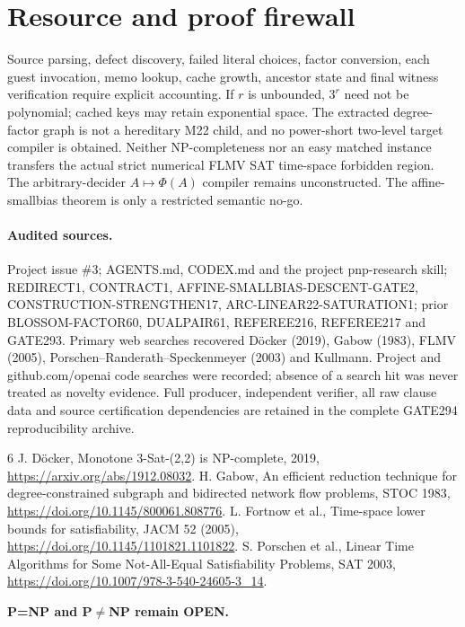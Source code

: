 \documentclass[11pt]{article}
\begin{document}
\section{Resource and proof firewall}
Source parsing, defect discovery, failed literal choices, factor conversion, each guest invocation, memo lookup, cache growth, ancestor state and final witness verification require explicit accounting. If $r$ is unbounded, $3^r$ need not be polynomial; cached keys may retain exponential space. The extracted degree-factor graph is not a hereditary M22 child, and no power-short two-level target compiler is obtained. Neither NP-completeness nor an easy matched instance transfers the actual strict numerical FLMV SAT time-space forbidden region. The arbitrary-decider $A\mapsto\Phi(A)$ compiler remains unconstructed. The affine-smallbias theorem is only a restricted semantic no-go.
\paragraph{Audited sources.}
Project issue \#3; AGENTS.md, CODEX.md and the project pnp-research skill; REDIRECT1, CONTRACT1, AFFINE-SMALLBIAS-DESCENT-GATE2, CONSTRUCTION-STRENGTHEN17, ARC-LINEAR22-SATURATION1; prior BLOSSOM-FACTOR60, DUALPAIR61, REFEREE216, REFEREE217 and GATE293. Primary web searches recovered D\"ocker (2019), Gabow (1983), FLMV (2005), Porschen--Randerath--Speckenmeyer (2003) and Kullmann. Project and github.com/openai code searches were recorded; absence of a search hit was never treated as novelty evidence. Full producer, independent verifier, all raw clause data and source certification dependencies are retained in the complete GATE294 reproducibility archive.
\begin{thebibliography}{6}
 J. D\"ocker, Monotone 3-Sat-(2,2) is NP-complete, 2019, \url{https://arxiv.org/abs/1912.08032}.
 H. Gabow, An efficient reduction technique for degree-constrained subgraph and bidirected network flow problems, STOC 1983, \url{https://doi.org/10.1145/800061.808776}.
 L. Fortnow et al., Time-space lower bounds for satisfiability, JACM 52 (2005), \url{https://doi.org/10.1145/1101821.1101822}.
 S. Porschen et al., Linear Time Algorithms for Some Not-All-Equal Satisfiability Problems, SAT 2003, \url{https://doi.org/10.1007/978-3-540-24605-3_14}.
\end{thebibliography}
\noindent\textbf{P=NP and P$\ne$NP remain OPEN.}
\end{document}
